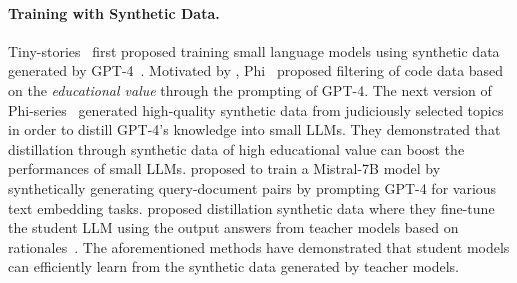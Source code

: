 \paragraph{Training with Synthetic Data.}
Tiny-stories~\cite{eldan2023tinystories} first proposed training small language models using synthetic data generated by GPT-4~\cite{achiam2023gpt}. Motivated by \cite{eldan2023tinystories}, Phi~\cite{gunasekar2023textbooks} proposed filtering of code data based on the \emph{educational value} through the prompting of GPT-4.
The next version of Phi-series~\cite{li2023textbooks, abdin2024phi} generated high-quality synthetic data from judiciously selected topics in order to distill GPT-4's knowledge into small LLMs. They demonstrated that distillation through synthetic data of high educational value can boost the performances of small LLMs. \cite{wang2023improving} proposed to train a Mistral-7B model \cite{jiang2023mistral} by synthetically generating query-document pairs by prompting GPT-4 for various text embedding tasks. 
\cite{yu2024distilling} proposed distillation synthetic data where they fine-tune the student LLM using the output answers from teacher models
based on rationales~\cite{wei2022chain, deng2023rephrase}. The aforementioned methods have demonstrated that student models can efficiently learn from the synthetic data generated by teacher models.